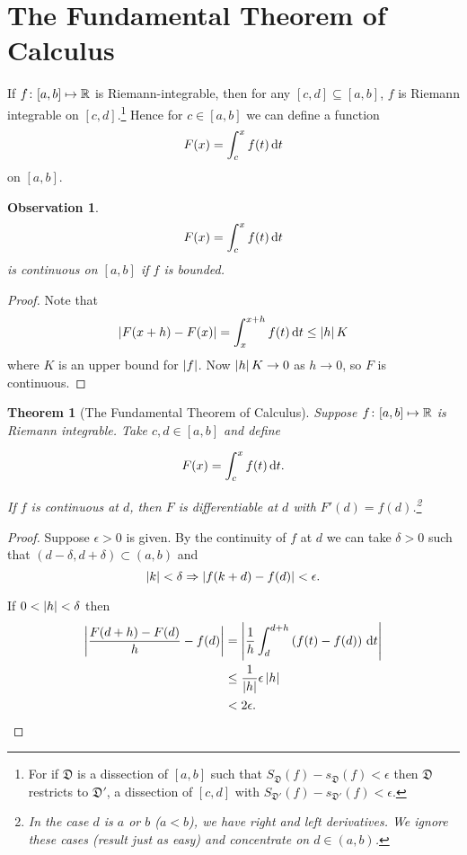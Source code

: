 \documentclass{notes}
\theoremstyle{plain}
\newtheorem{theorem}[proposition]{Theorem}
\newtheorem{observation}[proposition]{Observation}
\newcommand{\dis}{\mathfrak{D}}
\begin{document}
\section{The Fundamental Theorem of Calculus}

If $ f\colon [a,b] \mapsto \mathbb{R} $ is Riemann-integrable, then for any 
$ [c,d] \subseteq [a,b] $, $ f $ is Riemann integrable on $ [c,d] 
$.\footnote{%
For if $ \dis $ is a dissection of $ [a,b] $ such that
$S_{\dis}(f)-s_{\dis}(f) < \epsilon$
then $ \dis $ restricts to $ \dis' $, a dissection of $ [c,d] $ 
with $S_{\dis'}(f)-s_{\dis'}(f) < \epsilon$.}
Hence for $ c \in [a,b] $ we can define a function
\[ F(x) = \int_{c}^{x}f(t)\,\mathrm{d} t \]
on $ [a,b] $.

\begin{observation}
\[ F(x) = \int_{c}^{x}f(t)\,\mathrm{d} t \]
is continuous on $ [a,b] $ if $f$ is bounded.
\end{observation}

\begin{proof}
Note that 
\[
\left| F(x+h)-F(x)\right| = \int_{x}^{x+h}f(t)\,\mathrm{d} t \leq \left|h\right|K
\]
where $ K $ is an upper bound for $ \left|f\right| $.
Now $\left|h\right|K \to 0$ as $ h \to 0 $, so $ F $ is continuous.
\end{proof}

\begin{theorem}[The Fundamental Theorem of Calculus]
Suppose $ f\colon [a,b] \mapsto \mathbb{R} $ is Riemann integrable.
Take $ c,d \in [a,b] $ and define

\[ F(x)= \int_{c}^{x}f(t)\,\mathrm{d} t. \]

If $ f $ is continuous at $ d $, then $ F $ is differentiable at $ d
$ with $ F'(d)=f(d) $.\footnote{ In the case $ d $ is $ a $ or $ b $
  ($ a<b $), we have right and left derivatives. We ignore these cases
  (result just as easy) and concentrate on $ d \in (a,b) $.}
\end{theorem}

\begin{proof}
Suppose $ \epsilon>0 $ is given.
By the continuity of $ f $ at $ d $ we can take $ \delta>0 $ such that
$(d-\delta, d+\delta) \subset (a,b)$
and
\[ \left|k\right|< \delta \Rightarrow \left|f(k+d)-f(d)\right| < \epsilon. \]

If $ 0 < \left|h\right| < \delta $ then
\begin{align*}
\left| \frac{F(d+h)-F(d)}{h} - f(d)\right| & = \left| \frac{1}{h} 
\int_{d}^{d+h}\left( f(t)-f(d) \right)\,\mathrm{d} t \right| \\
& \leq \frac{1}{\left|h\right|} \epsilon \left|h\right| \\
& < 2 \epsilon.
\end{align*}
\end{proof}
\end{document}
